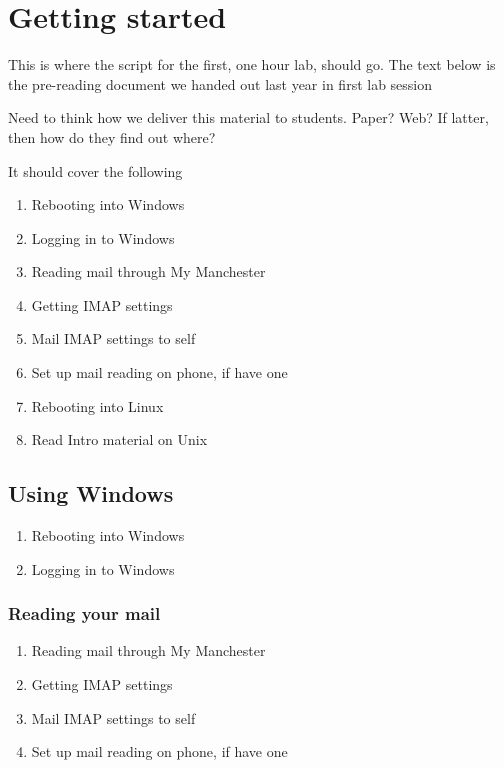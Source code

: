 \setcounter{chapter}{-1}

\chapter{Getting started}
\label{cha:getting-started}

\minitoc

\begin{note}
  This is where the script for the first, one hour lab, should go. The text below is the pre-reading document we handed out last year in first lab session

  Need to think how we deliver this material to students. Paper? Web?  If latter, then how do they find out where?

  It should cover the following
  \begin{enumerate}
  \item Rebooting into Windows
  \item Logging in to Windows
  \item Reading mail through My Manchester
  \item Getting IMAP settings
  \item Mail IMAP settings to self
  \item Set up mail reading on phone, if have one
  \item Rebooting into Linux
  \item Read Intro material on Unix
  \end{enumerate}
\end{note}


\section{Using Windows}
\label{sec:using-windows}
  \begin{enumerate}
  \item Rebooting into Windows
  \item Logging in to Windows
  \end{enumerate}


\subsection{Reading your mail}
\label{sec:reading-your-mail}
  \begin{enumerate}
  \item Reading mail through My Manchester
  \item Getting IMAP settings
  \item Mail IMAP settings to self
  \item Set up mail reading on phone, if have one
  \end{enumerate}

